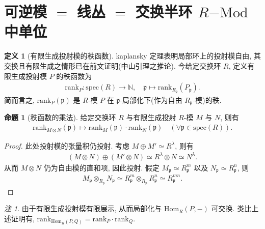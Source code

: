 \documentclass{MainStyle}
\theoremstyle{definition}
\theoremstyle{definition}
\theoremstyle{definition}
\newtheorem{definition}{定义}
\theoremstyle{definition}
\newtheorem{proposition}{命题}
\theoremstyle{definition}
\theoremstyle{definition}
\theoremstyle{definition}
\theoremstyle{remark}
\newtheorem{remark}{注}
\theoremstyle{remark}
\begin{document}
\maketitle

\section{可逆模 $=$ 线丛 $=$ 交换半环 $R\mathrm{-Mod}$ 中单位}

\begin{definition}[有限生成投射模的秩函数]
    kaplansky 定理表明局部环上的投射模自由, 其交换且有限生成之情形已在前文证明(中山引理之推论). 今给定交换环 $R$, 定义有限生成投射模 $P$ 的秩函数为
    \begin{align*}
        \mathrm{rank}_P:\mathrm{spec}(R)\to \mathbb N,\quad \mathfrak p\mapsto \mathrm{rank}_{R_{\mathfrak p}}(P_{\mathfrak p}).
    \end{align*}
    简而言之, $\mathrm{rank}_P(\mathfrak p)$ 是 $R$-模 $P$ 在 $\mathfrak p$-局部化下(作为自由 $R_{\mathfrak p}$-模)的秩.
\end{definition}

\begin{proposition}[秩函数的乘法]
    给定交换环 $R$ 与有限生成投射 $R$-模 $M$ 与 $N$, 则有
    \begin{align*}
        \mathrm{rank}_{M\otimes N}(\mathfrak p)\mapsto \mathrm{rank}_M(\mathfrak p)\cdot \mathrm{rank}_N(\mathfrak p)\quad (\forall \mathfrak p\in \mathrm{spec}(R)).
    \end{align*}
    \begin{proof}
        此处投射模的张量积仍投射. 考虑 $M\oplus M'\simeq R^\lambda$, 则有
        \begin{align*}
            (M\otimes N)\oplus (M'\otimes N)\simeq R^\lambda\otimes N \simeq N^\lambda.
        \end{align*}
        从而 $M\otimes N$ 仍为自由模的直和项, 因此投射. 假定 $M_{\mathfrak p}\simeq R_{\mathfrak p}^m$ 以及 $N_{\mathfrak p}\simeq R_{\mathfrak p}^n$, 则
        \begin{align*}
            M_{\mathfrak p}\otimes_{R_{\mathfrak p}} N_{\mathfrak p}\simeq R_{\mathfrak p}^m\otimes_{R_{\mathfrak p}} R_{\mathfrak p}^n\simeq R_{\mathfrak p}^{mn}.
        \end{align*}
    \end{proof}
\end{proposition}

\begin{remark}
    由于有限生成投射模有限展示, 从而局部化与 $\mathrm{Hom}_R(P,-)$ 可交换. 类比上述证明有, $\mathrm{rank}_{\mathrm{Hom}_R(P,Q)}=\mathrm{rank}_P\cdot \mathrm{rank}_Q$.
\end{remark}
\end{document}
